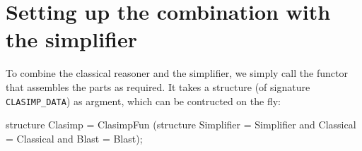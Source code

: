 
\section{Setting up the combination with the simplifier}
\label{sec:clasimp-setup}

To combine the classical reasoner and the simplifier, we simply call the 
\ML{} functor  that assembles the parts as required. 
It takes a structure (of signature \texttt{CLASIMP_DATA}) as
argment, which can be contructed on the fly:
\begin{ttbox}
structure Clasimp = ClasimpFun
 (structure Simplifier = Simplifier 
        and Classical  = Classical 
        and Blast      = Blast);
\end{ttbox}
%
